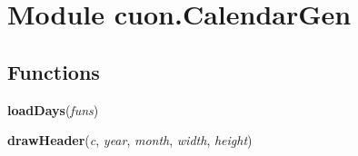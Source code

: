 %
%
%


\section{Module cuon.CalendarGen}

    \label{cuon:CalendarGen}


  \subsection{Functions}

    \label{cuon:CalendarGen:loadDays}

    \vspace{0.5ex}

\hspace{.8\funcindent}\begin{boxedminipage}{\funcwidth}

    \raggedright \textbf{loadDays}(\textit{funs})

\setlength{\parskip}{2ex}
\setlength{\parskip}{1ex}
    \end{boxedminipage}

    \label{cuon:CalendarGen:drawHeader}

    \vspace{0.5ex}

\hspace{.8\funcindent}\begin{boxedminipage}{\funcwidth}

    \raggedright \textbf{drawHeader}(\textit{c}, \textit{year}, \textit{month}, \textit{width}, \textit{height})

\setlength{\parskip}{2ex}
\setlength{\parskip}{1ex}
    \end{boxedminipage}

